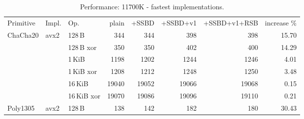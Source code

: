 


\setlength{\tabcolsep}{3pt}
\begin{table}[H]
    \caption{Performance: 11700K - fastest implementations.}
    \label{tab:results:all:11700K:avx2}
  \begin{tabular}{lllrrrrr}
  \toprule
    Primitive
 & Impl. & Op.          & plain & +SSBD & +SSBD+v1 & +SSBD+v1+RSB & increase \% \\

    \multirow{6}{*}{ChaCha20}
 &  \multirow{6}{*}{avx2}
         & 128\,B       & 344
                        & 344
                        & 398
                        & 398
                        & 15.70 \\

 &       & 128\,B xor   & 350
                        & 350
                        & 402
                        & 400
                        & 14.29 \\

 &       & 1\,KiB       & 1198
                        & 1202
                        & 1244
                        & 1246
                        & 4.01 \\

 &       & 1\,KiB xor   & 1208
                        & 1212
                        & 1248
                        & 1250
                        & 3.48 \\

 &       & 16\,KiB      & 19040
                        & 19052
                        & 19066
                        & 19068
                        & 0.15 \\

 &       & 16\,KiB xor  & 19070
                        & 19086
                        & 19096
                        & 19110
                        & 0.21 \\

     \midrule
    \multirow{6}{*}{Poly1305}
 &  \multirow{6}{*}{avx2}

        & 128\,B        & 138
                        & 142
                        & 182
                        & 180
                        & 30.43 \\


\end{tabular}
\end{table}
